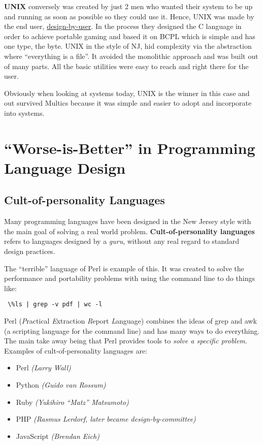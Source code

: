 \documentclass[twoside]{article}
\begin{document}
\textbf{UNIX} conversely was created by just 2 men who wanted their system to be
up and running as soon as possible so they could use it. Hence, UNIX was made by
the end user, \underline{design-by-user}. In the process they designed the C
language in order to achieve portable gaming and based it on BCPL which is
simple and has one type, the byte. UNIX in the style of NJ, hid complexity via
the abstraction where ``everything is a file''. It avoided the monolithic
approach and was built out of many parts. All the basic utilities were easy to
reach and right there for the user.  

Obviously when looking at systems today, UNIX is the winner in this case and out
survived Multics because it was simple and easier to adopt and incorporate into
systems. 

\section{``Worse-is-Better'' in Programming Language Design}

\subsection{Cult-of-personality Languages}

Many programming languages have been designed in the New Jersey style with the
main goal of solving a real world problem. \textbf{Cult-of-personality
languages}  refers to languages designed by a \emph{guru}, without any real
regard to standard design practices.
 
The ``terrible'' language of Perl is example of this. It was created to solve
the performance and portability problems with using the command line to do
things like:
\begin{verbatim} \%ls | grep -v pdf | wc -l \end{verbatim}
Perl (\emph{P}ractical \emph{E}xtraction \emph{R}eport \emph{L}anguage) combines
the ideas of grep and awk (a scripting language for the command line) and has
many ways to do everything.  The main take away being that Perl provides tools
to \emph{solve a specific problem}.  Examples of cult-of-personality languages
are:

\begin{itemize}
  \item Perl \emph{(Larry Wall)}
  \item Python \emph{(Guido van Rossum)}
  \item Ruby \emph{(Yukihiro ``Matz'' Matsumoto)}
  \item PHP \emph{(Rasmus Lerdorf, later became design-by-committee)}
  \item JavaScript \emph{(Brendan Eich)}
\end{itemize}
\end{document}
